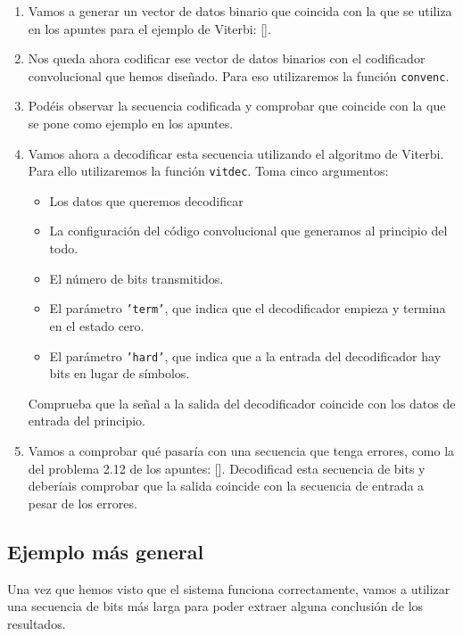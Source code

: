 \documentclass[es,practica,12pt]{uah}
\begin{document}
\begin{enumerate}
		\item Vamos a generar un vector de datos binario que coincida con la que se utiliza en los apuntes para el ejemplo de Viterbi: [].
		\item Nos queda ahora codificar ese vector de datos binarios con el codificador convolucional que hemos diseñado. Para eso utilizaremos la función \texttt{convenc}.
		\item Podéis observar la secuencia codificada y comprobar que coincide con la que se pone como ejemplo en los apuntes. 
		\item Vamos ahora a decodificar esta secuencia utilizando el algoritmo de Viterbi. Para ello utilizaremos la función \texttt{vitdec}. Toma cinco argumentos:
		\begin{itemize}
			\item Los datos que queremos decodificar
			\item La configuración del código convolucional que generamos al principio del todo.
			\item El número de bits transmitidos.
			\item El parámetro \texttt{'term'}, que indica que el decodificador empieza y termina en el estado cero. 
			\item El parámetro \texttt{'hard'}, que indica que a la entrada del decodificador hay bits en lugar de símbolos. 
		\end{itemize}
		Comprueba que la señal a la salida del decodificador coincide con los datos de entrada del principio. 

		\item Vamos a comprobar qué pasaría con una secuencia que tenga errores, como la del problema 2.12 de los apuntes: []. Decodificad esta secuencia de bits y deberíais comprobar que la salida coincide con la secuencia de entrada a pesar de los errores. 
	\end{enumerate}

\subsection{Ejemplo más general}
	Una vez que hemos visto que el sistema funciona correctamente, vamos a utilizar una secuencia de bits más larga para poder extraer alguna conclusión de los resultados.
\end{document}
